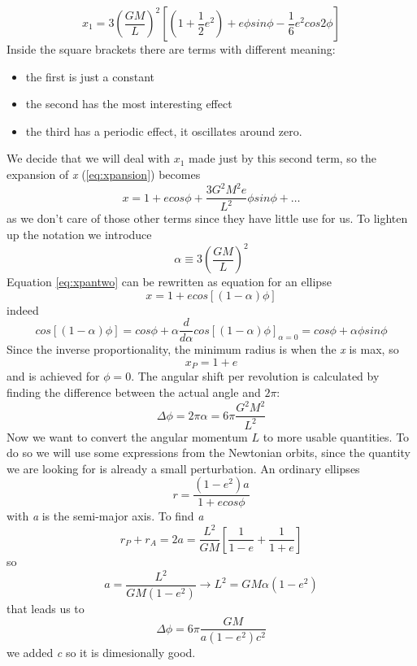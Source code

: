 \begin{equation}
x_{1} = 3 \left( \frac{GM}{L} \right)^{2}  \left[ \left( 1+ \frac{1}{2}e^{2} \right) + e\phi sin\phi - \frac{1}{6}e^{2}cos2\phi  \right]
\end{equation}
Inside the square brackets there are terms with different meaning:
\begin{itemize}
\item the first is just a constant
\item the second has the most interesting effect
\item the third has a periodic effect, it oscillates around zero.
\end{itemize}
We decide that we will deal with $x_{1}$ made just by this second term, so the expansion of \emph{x} (\ref{eq:xpansion}) becomes
\begin{equation}\label{eq:xpantwo}
x = 1 + ecos\phi + \frac{3G^{2}M^{2}e}{L^{2}}\phi sin\phi + \ldots 
\end{equation}
as we don't care of those other terms since they have little use for us. To lighten up the notation we introduce
\[
\alpha \equiv 3 \left( \frac{GM}{L} \right)^{2}
\]
Equation \ref{eq:xpantwo} can be rewritten as equation for an ellipse
\begin{equation}
x = 1 + ecos\left[ \left( 1-\alpha  \right)\phi  \right]
\end{equation}
indeed
\[
cos\left[ \left( 1-\alpha  \right)\phi  \right] = cos\phi  + \alpha \frac{d }{d \alpha }cos\left[ \left( 1-\alpha  \right)\phi  \right]_{\alpha =0} = cos\phi + \alpha \phi sin \phi 
\]
Since the inverse proportionality, the minimum radius is when the \emph{x} is max, so
\[
x_{P} = 1 +e
\]
and is achieved for $\phi =0$. The angular shift per revolution is calculated by finding the difference between the actual angle and $2\pi $:
\[
\Delta \phi = 2\pi \alpha = 6\pi \frac{G^{2}M^{2}}{L^{2}}
\]
Now we want to convert the angular momentum $L$ to more usable quantities. To do so we will use some expressions from the Newtonian orbits, since the quantity we are looking for is already a small perturbation. An ordinary ellipses
\[
r = \frac{\left( 1-e^{2} \right)a}{1+ecos\phi }
\]
with \emph{a} is the semi-major axis. To find \emph{a}
\[
r_{P} +r_{A} = 2a = \frac{L^{2}}{GM}\left[ \frac{1}{1-e} + \frac{1}{1+e} \right]
\]
so 
\[
a = \frac{L^{2}}{GM \left( 1-e^{2} \right)} \to  L^{2 }= GM\alpha \left( 1-e^{2} \right)
\]
that leads us to
\begin{equation}
\Delta \phi  = 6\pi \frac{GM}{a\left( 1-e^{2} \right)c^{2}}
\end{equation}
we added \emph{c} so it is dimesionally good.

